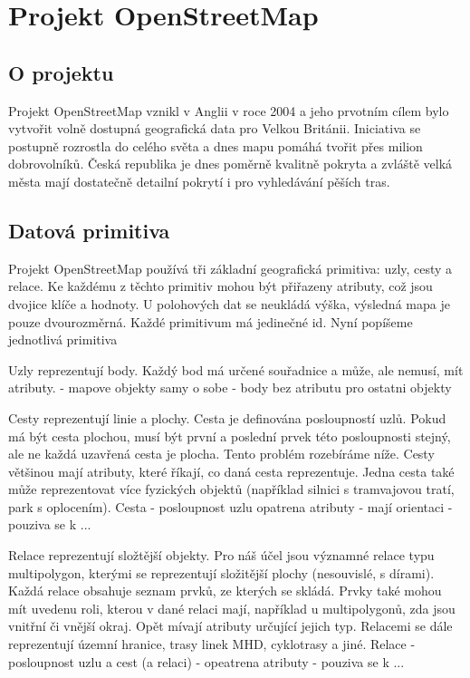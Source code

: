\chapter{Projekt OpenStreetMap}
\section{O projektu}
Projekt OpenStreetMap\cite{osmweb} vznikl v Anglii v roce 2004 a jeho prvotním cílem bylo
vytvořit volně dostupná geografická data pro Velkou Británii. Iniciativa se
postupně rozrostla do celého světa a dnes mapu pomáhá tvořit přes milion
dobrovolníků. Česká republika je dnes poměrně kvalitně pokryta a zvláště velká
města mají dostatečně detailní pokrytí i pro vyhledávání pěších tras.

\section{Datová primitiva} 
Projekt OpenStreetMap používá tři základní geografická primitiva: uzly, cesty a
relace. Ke každému z těchto primitiv mohou být přiřazeny atributy, což jsou
dvojice klíče a hodnoty. 
U polohových dat se neukládá výška, výsledná mapa je pouze dvourozměrná.
Každé primitivum má jedinečné id.
Nyní popíšeme jednotlivá primitiva

{\tuc Uzly} reprezentují body. Každý bod má určené souřadnice a může, ale nemusí,
mít atributy.
- mapove objekty samy o sobe
- body bez atributu pro ostatni objekty

{\tuc Cesty} reprezentují linie a plochy. Cesta je definována posloupností uzlů.
Pokud má být cesta plochou, musí být první a poslední prvek této posloupnosti
stejný, ale ne každá uzavřená cesta je plocha. Tento problém rozebíráme níže.
Cesty většinou mají atributy, které říkají, co daná cesta reprezentuje. Jedna
cesta také může reprezentovat více fyzických objektů (například silnici s
tramvajovou tratí, park s oplocením).
Cesta
- posloupnost uzlu opatrena atributy
- mají orientaci
- pouziva se k ...

{\tuc Relace} reprezentují složtější objekty. Pro náš účel jsou významné relace
typu multipolygon, kterými se reprezentují složitější plochy (nesouvislé, s
dírami). Každá relace obsahuje seznam prvků, ze kterých se skládá. Prvky také
mohou mít uvedenu roli, kterou v dané relaci mají, například u multipolygonů,
zda jsou vnitřní či vnější okraj. Opět mívají atributy určující jejich typ.
Relacemi se dále reprezentují územní hranice, trasy linek MHD, cyklotrasy a
jiné.
Relace
- posloupnost uzlu a cest (a relaci)
- opeatrena atributy
- pouziva se k ...

